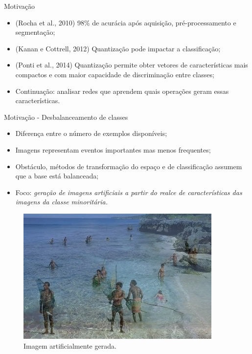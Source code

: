 \documentclass{beamer}
\begin{document}
\begin{frame}{Motivação}
\setlength\leftmargini{0em}
\justifying
  \begin{itemize}
\justifying
    \item (Rocha et al., 2010) 98\% de acurácia após aquisição, pré-processamento e segmentação; %
    \item (Kanan e Cottrell, 2012) Quantização pode impactar a classificação;
    \item (Ponti et al., 2014) Quantização permite obter vetores de características mais compactos e com maior capacidade de discriminação entre classes;
    \item[]  {Continuação: analisar redes que aprendem quais operações geram essas características.}
  \end{itemize}
\end{frame}
\begin{frame}{Motivação - Desbalanceamento de classes}
\setlength\leftmargini{0em}
\justifying
  \begin{itemize}
    \item Diferença entre o número de exemplos disponíveis;
    \item Imagens representam eventos importantes mas menos frequentes;
    \item Obstáculo, métodos de transformação do espaço e de 
    classificação assumem que a base está balanceada;
    \item Foco: \emph{geração de imagens artificiais a partir do realce de características das imagens da classe minoritária.}
  \end{itemize}
  \begin{figure}[htbp]
 \begin{center}
   \includegraphics[width=.4\linewidth]{figuras/imagemgerada.jpg}
 \caption{Imagem artificialmente gerada.}
 \end{center}
\end{figure}

\end{frame}
\end{document}
